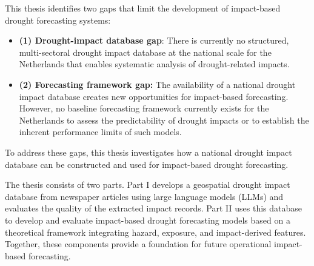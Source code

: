 This thesis identifies two gaps that limit the development of impact-based drought forecasting systems:

\begin{itemize}

\item \textbf{(1) Drought-impact database gap}: There is currently no structured, multi-sectoral drought impact database at the national scale for the Netherlands that enables systematic analysis of drought-related impacts.

\item \textbf{(2) Forecasting framework gap:} The availability of a national drought impact database creates new opportunities for impact-based forecasting. However, no baseline forecasting framework currently exists for the Netherlands to assess the predictability of drought impacts or to establish the inherent performance limits of such models.

\end{itemize}


To address these gaps, this thesis investigates how a national drought impact database can be constructed and used for impact-based drought forecasting.

The thesis consists of two parts. Part I develops a geospatial drought impact database from newspaper articles using large language models (LLMs) and evaluates the quality of the extracted impact records. Part II uses this database to develop and evaluate impact-based drought forecasting models based on a theoretical framework integrating hazard, exposure, and impact-derived features. Together, these components provide a foundation for future operational impact-based forecasting.
